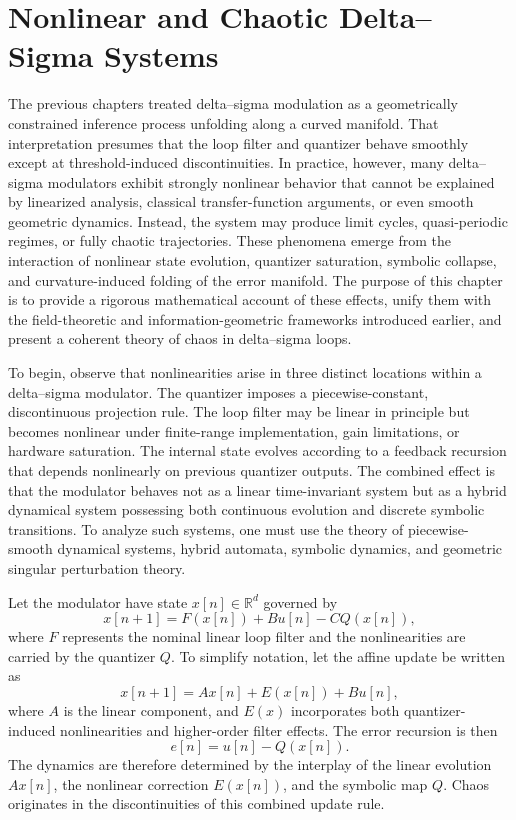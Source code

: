 \chapter{Nonlinear and Chaotic Delta--Sigma Systems}

The previous chapters treated delta–sigma modulation as a geometrically constrained inference process unfolding along a curved manifold. That interpretation presumes that the loop filter and quantizer behave smoothly except at threshold-induced discontinuities. In practice, however, many delta–sigma modulators exhibit strongly nonlinear behavior that cannot be explained by linearized analysis, classical transfer-function arguments, or even smooth geometric dynamics. Instead, the system may produce limit cycles, quasi-periodic regimes, or fully chaotic trajectories. These phenomena emerge from the interaction of nonlinear state evolution, quantizer saturation, symbolic collapse, and curvature-induced folding of the error manifold. The purpose of this chapter is to provide a rigorous mathematical account of these effects, unify them with the field-theoretic and information-geometric frameworks introduced earlier, and present a coherent theory of chaos in delta–sigma loops.

To begin, observe that nonlinearities arise in three distinct locations within a delta–sigma modulator. The quantizer imposes a piecewise-constant, discontinuous projection rule. The loop filter may be linear in principle but becomes nonlinear under finite-range implementation, gain limitations, or hardware saturation. The internal state evolves according to a feedback recursion that depends nonlinearly on previous quantizer outputs. The combined effect is that the modulator behaves not as a linear time-invariant system but as a hybrid dynamical system possessing both continuous evolution and discrete symbolic transitions. To analyze such systems, one must use the theory of piecewise-smooth dynamical systems, hybrid automata, symbolic dynamics, and geometric singular perturbation theory.

Let the modulator have state \( x[n] \in \mathbb{R}^{d} \) governed by
\[
x[n+1] = F(x[n]) + B u[n] - C Q(x[n]),
\]
where \(F\) represents the nominal linear loop filter and the nonlinearities are carried by the quantizer \(Q\). To simplify notation, let the affine update be written as
\[
x[n+1] = A x[n] + E(x[n]) + B u[n],
\]
where \(A\) is the linear component, and \(E(x)\) incorporates both quantizer-induced nonlinearities and higher-order filter effects. The error recursion is then
\[
e[n] = u[n] - Q(x[n]).
\]
The dynamics are therefore determined by the interplay of the linear evolution \(A x[n]\), the nonlinear correction \(E(x[n])\), and the symbolic map \(Q\). Chaos originates in the discontinuities of this combined update rule.

